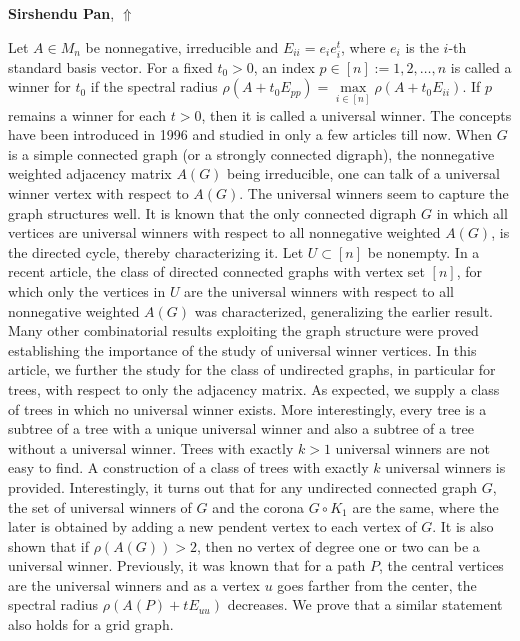 \documentclass[ILAS2025-program.tex]{subfiles}
\begin{document}
\hypertarget{down0408}{}\begin{ilasabstract}
    
\textbf{Sirshendu Pan},  \hfill \hyperlink{up0408}{$\Uparrow$}
    
    
\mtskip
    Let $A \in M_n$ be nonnegative, irreducible and $E_{ii}=e_ie_i^t$, where $e_i$ is the $i$-th standard basis vector. For a fixed $t_0>0$, an index $p \in [n]:={1,2,\ldots,n}$ is called a winner for $t_0$ if the spectral radius $\rho(A+t_0E_{pp})=\max\limits_{i\in [n]}\rho(A+t_0E_{ii})$. If $p$ remains a winner for each $t>0$, then it is called a universal winner. The concepts have been introduced in 1996 and studied in only a few articles till now. When $G$ is a simple connected graph (or a strongly connected digraph), the nonnegative weighted adjacency matrix $A(G)$ being irreducible, one can talk of a universal winner vertex with respect to $A(G)$. The universal winners seem to capture the graph structures well. It is known that the only connected digraph $G$ in which all vertices are universal winners with respect to all nonnegative weighted $A(G)$, is the directed cycle, thereby characterizing it. Let $U\subset [n]$ be nonempty. In a recent article, the class of directed connected graphs with vertex set $[n]$, for which only the vertices in $U$ are the universal winners with respect to all nonnegative weighted $A(G)$ was characterized, generalizing the earlier result. Many other combinatorial results exploiting the graph structure were proved establishing the importance of the study of universal winner vertices. In this article, we further the study for the class of undirected graphs, in particular for trees, with respect to only the adjacency matrix. As expected, we supply a class of trees in which no universal winner exists. More interestingly, every tree is a subtree of a tree with a unique universal winner and also a subtree of a tree without a universal winner. Trees with exactly $k>1$ universal winners are not easy to find. A construction of a class of trees with exactly $k$ universal winners is provided. Interestingly, it turns out that for any undirected connected graph $G$, the set of universal winners of $G$ and the corona $G\circ K_1$ are the same, where the later is obtained by adding a new pendent vertex to each vertex of $G$. It is also shown that if $\rho(A(G))>2$, then no vertex of degree one or two can be a universal winner. Previously, it was known that for a path $P$, the central vertices are the universal winners and as a vertex $u$ goes farther from the center, the spectral radius $\rho(A(P)+tE_{uu})$ decreases. We prove that a similar statement also holds for a grid graph.
\end{ilasabstract}
    
\end{document}
